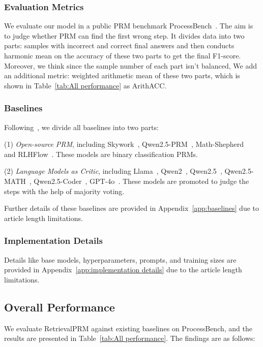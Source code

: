 \subsubsection{Evaluation Metrics}
We evaluate our model in a public PRM benchmark ProcessBench~\cite{zheng2024processbench}. The aim is to judge whether PRM can find the first wrong step. It divides data into two parts: samples with incorrect and correct final answers and then conducts harmonic mean on the accuracy of these two parts to get the final F1-score. Moreover, we think since the sample number of each part isn't balanced, We add an additional metric: weighted arithmetic mean of these two parts, which is shown in Table~\ref{tab:All performance} as ArithACC.

\subsubsection{Baselines}
Following~\cite{zheng2024processbench}, we divide all baselines into two parts:

(1) \textit{Open-source PRM}, including Skywork~\cite{skyworkopeno12024}, Qwen2.5-PRM~\cite{zheng2024processbench}, Math-Shepherd~\cite{wang2024math} and RLHFlow~\cite{xiong2024rlhflowmath}. These models are binary classification PRMs.

(2) \textit{Language Models as Critic}, including Llama~\cite{dubey2024llama}, Qwen2~\cite{yang2024qwen2}, Qwen2.5~\cite{qwen2.5}, Qwen2.5-MATH~\cite{yang2024qwen25mathtechnicalreportmathematical}, Qwen2.5-Coder~\cite{hui2024qwen25codertechnicalreport}, GPT-4o~\cite{openai2024gpt4ocard}. These models are promoted to judge the steps with the help of majority voting.

Further details of these baselines are provided in Appendix~\ref{app:baselines} due to article length limitations. 

\subsubsection{Implementation Details}
Details like base models, hyperparameters, prompts, and training sizes are provided in Appendix~\ref{app:implementation details} due to the article length limitations.

\subsection{Overall Performance}
We evaluate RetrievalPRM against existing baselines on ProcessBench, and the results are presented in Table~\ref{tab:All performance}. The findings are as follows:

